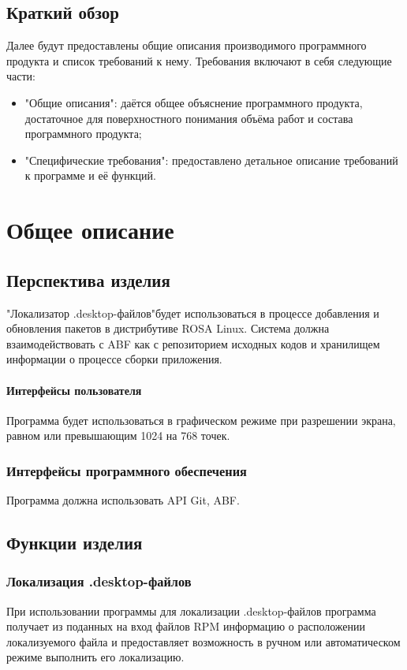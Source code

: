 \documentclass[a4paper,10pt]{report}
\newcommand{\ldf}{"Локализатор .desktop-файлов"}
\newcommand{\df}{.desktop-файл}
\begin{document}
\section{Краткий обзор}
Далее будут предоставлены общие описания производимого программного продукта и список требований к нему. Требования включают в себя следующие части:
\begin{itemize}
	\item "Общие описания": даётся общее объяснение программного продукта, достаточное для поверхностного понимания объёма работ и состава программного продукта;
	\item "Специфические требования": предоставлено детальное описание требований к программе и её функций.
\end{itemize}

\chapter{Общее описание}

\section{Перспектива изделия}
\ldf будет использоваться в процессе добавления и обновления пакетов в дистрибутиве ROSA Linux. Система должна взаимодействовать с ABF как с репозиторием исходных кодов и хранилищем информации о процессе сборки приложения.

\subsubsection{Интерфейсы пользователя}
Программа будет использоваться в графическом режиме при разрешении экрана, равном или превышающим 1024 на 768 точек.

\subsection{Интерфейсы программного обеспечения}
Программа должна использовать API Git, ABF.


\section{Функции изделия}
\subsection{Локализация {\df}ов}
При использовании программы для локализации {\df}ов программа получает из поданных на вход файлов RPM информацию о расположении локализуемого файла и предоставляет возможность в ручном или автоматическом режиме выполнить его локализацию.\textbf{}
\end{document}
